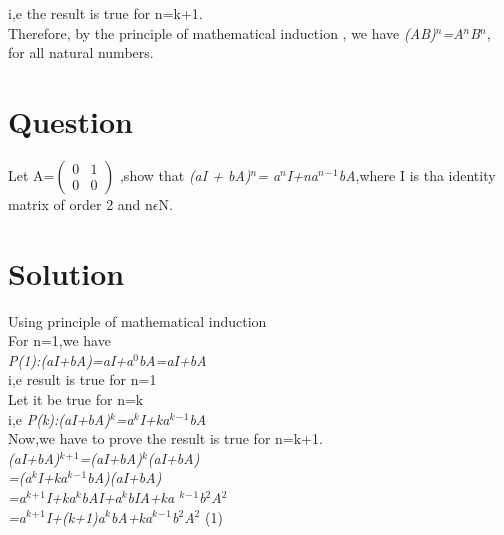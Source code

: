 \documentclass[a4paper,12pt]{article}
\begin{document}
 

i,e the result is true for n=k+1.\\

Therefore, by the principle of mathematical induction , we have \textit{(AB)$^n$=A$^n$B$^n$},\\  

for all natural numbers.


\section*{{\small Question}} Let A=$\begin{pmatrix} 0 & 1  \\ 0 & 0 \end{pmatrix}$ ,show that \textit{(aI + bA)$^n$= a$^n$I+na$^n$$^-$$^1$bA},where I is tha identity matrix of order 2 and n$\epsilon$N.

\section*{{\small Solution}}Using principle of mathematical induction\\
For n=1,we have\\

\textit{P(1):(aI+bA)=aI+a$^0$bA=aI+bA}\\

i,e 
result is true for n=1\\

Let it be true for n=k\\
               
i,e
\textit{P(k):(aI+bA)$^k$=a$^k$I+ka$^k$$^-$$^1$bA}\\

Now,we have to prove the result is true for n=k+1.\\

\textit{(aI+bA)$^k$$^+$$^1$=(aI+bA)$^k$(aI+bA)}\\

               \hspace*{2.2cm}     \textit{=(a$^k$I+ka$^k$$^-$$^1$bA)(aI+bA)}\\

                 \hspace*{2.2cm}   \textit{=a$^k$$^+$$^1$I+ka$^k$bAI+a$^k$bIA+ka $^k$$^-$$^1$b$^2$A$^2$}\\

                 \hspace*{2.2cm}     \textit{=a$^k$$^+$$^1$I+(k+1)a$^k$bA+ka$^k$$^-$$^1$b$^2$A$^2$}         \hspace{3cm}(1)\\
\end{document}
